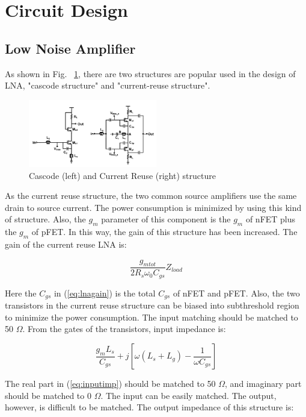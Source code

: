 \section{Circuit Design}
\subsection{Low Noise Amplifier}
As shown in Fig. ~\ref{fig:lna}, there are two structures are popular used in the design of LNA, "cascode structure" and "current-reuse structure". 

\begin{figure}[h]
   \centering
    \includegraphics[width=0.5\textwidth]{figures/LNA.png}
    \caption{Cascode (left) and Current Reuse (right) structure ~\cite{lna}}
    \label{fig:lna}
\end{figure}

As the current reuse structure, the two common source amplifiers use the same drain to source current. The power consumption is minimized by using this kind of structure. Also, the $g_m$ parameter of this component is the $g_m$ of nFET plus the $g_m$ of pFET. In this way, the gain of this structure has been increased. The gain of the current reuse LNA is:

\begin{equation} 
  	\frac{g_{mtot}}{2R_s \omega_0 C_{gs}}Z_{load}
	\label{eq:lnagain}
\end{equation}

Here the $C_{gs}$ in (\ref{eq:lnagain}) is the total $C_{gs}$ of nFET and pFET. Also, the two transistors in the current reuse structure can be biased into subthreshold region to minimize the power consumption. The input matching should be matched to 50 $\Omega$. From the gates of the transistors, input impedance is:

\begin{equation} 
  	\frac{g_mL_s}{C_{gs}} + j[\omega (L_s+L_g) - \frac{1}{\omega C_{gs}}]
	\label{eq:inputimp}
\end{equation}

The real part in (\ref{eq:inputimp}) should be matched to 50 $\Omega$, and imaginary part should be matched to 0 $\Omega$. The input can be easily matched. The output, however, is difficult to be matched. The output impedance of this structure is:

